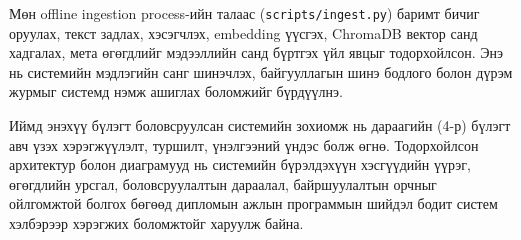 Мөн offline ingestion process-ийн талаас (\texttt{scripts/ingest.py}) баримт бичиг оруулах, текст задлах, хэсэгчлэх, embedding үүсгэх, ChromaDB вектор санд хадгалах, мета өгөгдлийг мэдээллийн санд бүртгэх үйл явцыг тодорхойлсон. Энэ нь системийн мэдлэгийн санг шинэчлэх, байгууллагын шинэ бодлого болон дүрэм журмыг системд нэмж ашиглах боломжийг бүрдүүлнэ.

Иймд энэхүү бүлэгт боловсруулсан системийн зохиомж нь дараагийн (4-р) бүлэгт авч үзэх хэрэгжүүлэлт, туршилт, үнэлгээний үндэс болж өгнө. Тодорхойлсон архитектур болон диаграмууд нь системийн бүрэлдэхүүн хэсгүүдийн үүрэг, өгөгдлийн урсгал, боловсруулалтын дараалал, байршуулалтын орчныг ойлгомжтой болгох бөгөөд дипломын ажлын программын шийдэл бодит систем хэлбэрээр хэрэгжих боломжтойг харуулж байна.
